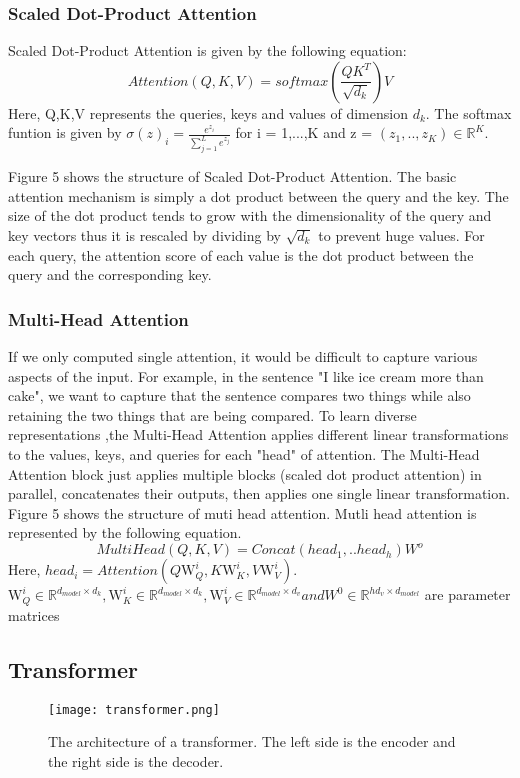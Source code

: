 \documentclass[12pt,a4paper]{article}
\numberwithin{equation}{section}
\begin{document}
\subsubsection{Scaled Dot-Product Attention }
Scaled Dot-Product Attention  is given by the following equation:
\begin{equation*}
    Attention(Q,K,V) = softmax(\frac{QK^{T}}{\sqrt{d_k}})V 
\end{equation*}
Here, Q,K,V represents the queries, keys and values of dimension $d_k$. The softmax funtion is given by $\sigma(z)_i = \frac{e^{z_i}}{\sum_{j=1}^{L} e^{z_j}}$ for i = 1,...,K and z = $(z_1,..,z_K) \in \mathbb{R}^K$.

Figure 5 shows the structure of Scaled Dot-Product Attention. The basic attention mechanism is simply a dot product between the query and the key. The size of the dot product tends to grow with the dimensionality of the query and key vectors thus it is rescaled by dividing by $\sqrt{d_k}$ to prevent huge values. For each query, the attention score of each value is the dot product between the query and the corresponding key.   

\subsubsection{Multi-Head Attention}
If we only computed single attention, it would be difficult to capture various aspects of the input. For example, in the sentence "I like ice cream more than cake", we want to capture that the sentence compares two things while also retaining the two things that are being compared. To learn diverse representations ,the Multi-Head Attention applies different linear transformations to the values, keys, and queries for each "head" of attention. The Multi-Head Attention block just applies multiple blocks (scaled dot product attention) in parallel, concatenates their outputs, then applies one single linear transformation. Figure 5 shows the structure of muti head attention. 
Mutli head attention is represented by the following equation.
\begin{equation*}
    MultiHead(Q,K,V) = Concat(head_1,..head_h)W^o
\end{equation*}
Here, $head_i = Attention(Q\text{W}^i_Q,K\text{W}^i_K,V\text{W}^i_V)$. $\text{W}^i_Q \in \mathbb{R}^{d_{model} \times d_k},\text{W}^i_K \in \mathbb{R}^{d_{model} \times d_k},\text{W}^i_V \in \mathbb{R}^{d_{model} \times d_v} and W^0 \in \mathbb{R}^{ hd_v \times d_{model}} $ are parameter matrices
\subsection{Transformer}
\begin{figure}
    \centering
    \texttt{[image: transformer.png]}
    \caption{The architecture of a transformer. The left side is the encoder and the right side is the decoder. }
   \label{fig:my_label}
\end{figure}
\end{document}
